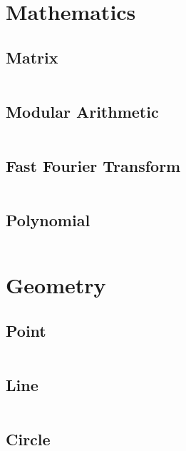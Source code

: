 \documentclass[11pt, a4paper]{amsart}
\begin{document}
	\section{Mathematics}
	\begin{multicols*}{2}
		\subsection{Matrix}
		\inputminted[firstline=18,lastline=67]{c++}{.code/maths/matrix.cpp}
		\vfill\null
		\columnbreak
		\subsection{Modular Arithmetic}
		\inputminted[firstline=15,lastline=40]{c++}{.code/maths/mod.cpp}
		\subsection{Fast Fourier Transform}
		\inputminted[firstline=20,lastline=29]{c++}{.code/maths/polynomial.cpp}
		\vfill\null
	\end{multicols*}
	\newpage
	\begin{multicols*}{2}
		\subsection{Polynomial}
		\inputminted[firstline=33,lastline=87]{c++}{.code/maths/polynomial.cpp}
		\vfill\null
		\columnbreak
		\vfill\null
	\end{multicols*}
	\newpage
	\section{Geometry}
	\begin{multicols*}{2}
		\subsection{Point}
		\inputminted[firstline=23,lastline=48]{c++}{.code/geometry/point.cpp}
		\subsection{Line}
		\inputminted[firstline=24,lastline=47]{c++}{.code/geometry/line.cpp}
		\vfill\null
		\columnbreak
		\subsection{Circle}
		\inputminted[firstline=25,lastline=69]{c++}{.code/geometry/circ.cpp}
		\vfill\null
	\end{multicols*}
\end{document}
